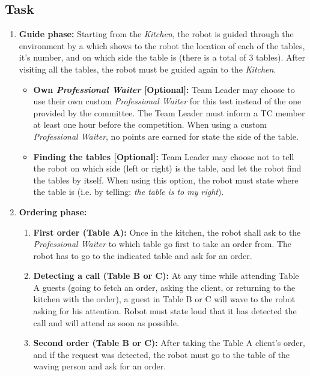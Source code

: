 \subsection{Task}
\begin{enumerate}

\item \textbf{Guide phase:} Starting from the \textit{Kitchen}, the robot is guided through the environment by a  which shows to the robot the location of each of the tables, it's number, and on which side the table is (there is a total of 3 tables). After visiting all the tables, the robot must be guided again to the \textit{Kitchen}.
\begin{itemize}
\item \textbf{Own \textit{Professional Waiter} [Optional]:} Team Leader may choose to use their own custom \textit{Professional Waiter} for this test instead of the one provided by the committee. The Team Leader must inform a TC member at least one hour before the competition. When using a custom \textit{Professional Waiter}, no points are earned for state the side of the table.
\item \textbf{Finding the tables [Optional]:} Team Leader may choose not to tell the robot on which side (left or right) is the table, and let the robot find the tables by itself. When using this option, the robot must state where the table is (i.e. by telling: \textit{the table is to my right}).
\end{itemize}

\item \textbf{Ordering phase:}
\begin{enumerate}
\item \textbf{First order (Table A):} Once in the kitchen, the robot shall ask to the \textit{Professional Waiter} to which table go first to take an order from. The robot has to go to the indicated table and ask for an order.

\item \textbf{Detecting a call (Table B or C):} At any time while attending Table A guests (going to fetch an order, asking the client, or returning to the kitchen with the order), a guest in Table B or C will wave to the robot asking for his attention. Robot must state loud that it has detected the call and will attend as soon as possible.

\item \textbf{Second order (Table B or C):} After taking the Table A client's order, and if the request was detected, the robot must go to the table of the waving person and ask for an order.


\end{enumerate}
\end{enumerate}
